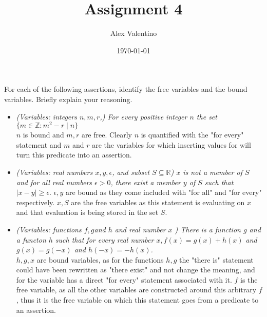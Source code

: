 \documentclass[12pt, letterpaper]{article}
\date{\today}
\author{Alex Valentino}
\title{Assignment 4}
\newcommand{\Z}{\mathbb{Z}}
\newcommand{\R}{\mathbb{R}}
\begin{document}
	For each of the following assertions, identify the free variables and the bound variables. Briefly explain your reasoning.\\
	\begin{itemize}
		\item \textit{(Variables: integers $n, m, r$,) For every positive integer $n$ the set $\{m \in \Z : m^2 - r \mid n \}$}\\
		$n$ is bound and $m,r$ are free.  Clearly $n$ is quantified with the "for every" statement and $m$ and $r$ are the variables for which inserting values for will turn this predicate into an assertion.  
		\item \textit{(Variables: real numbers $x, y, \epsilon$, and subset $S\subseteq \R$) $x$ is not a member of $S$ and for all real numbers $\epsilon > 0$, there exist a member $y$ of $S$ such that $|x-y|\geq \epsilon.$}  $\epsilon,y$ are bound as they come included with "for all" and "for every" respectively.  $x,S$ are the free variables as this statement is evaluating on $x$ and that evaluation is being stored in the set $S$.    
		\item \textit{(Variables: functions $f , g $and $h$ and real number $x$ ) There is a function $g$ and a
functon $h$ such that for every real number $x, f (x) = g(x) + h(x)$ and $g(x) = g(-x)$ and
$h(-x) = -h(x)$.}\\
		$h,g,x$ are bound variables, as for the functions $h,g$ the "there is" statement could have been rewritten as "there exist" and not change the meaning, and for the variable has a direct "for every" statement associated with it.  $f$ is the free variable, as all the other variables are constructed around this arbitrary $f$, thus it is the free variable on which this statement goes from a predicate to an assertion.
	\end{itemize}
 
\end{document}
